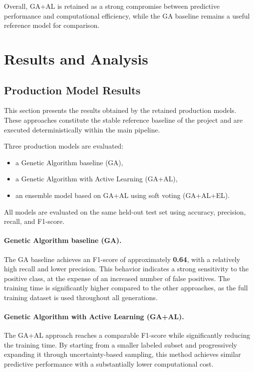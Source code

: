 \documentclass[12pt,a4paper]{article}
\begin{document}
\medskip

Overall, GA+AL is retained as a strong compromise between predictive performance and computational efficiency, while the GA baseline remains a useful reference model for comparison.

\section{Results and Analysis}

\subsection{Production Model Results}

This section presents the results obtained by the retained production models. These approaches constitute the stable reference baseline of the project and are executed deterministically within the main pipeline.

\medskip

Three production models are evaluated:
\begin{itemize}
    \item a Genetic Algorithm baseline (GA),
    \item a Genetic Algorithm with Active Learning (GA+AL),
    \item an ensemble model based on GA+AL using soft voting (GA+AL+EL).
\end{itemize}

All models are evaluated on the same held-out test set using accuracy, precision, recall, and F1-score.

\medskip

\paragraph{Genetic Algorithm baseline (GA).}
The GA baseline achieves an F1-score of approximately \textbf{0.64}, with a relatively high recall and lower precision. This behavior indicates a strong sensitivity to the positive class, at the expense of an increased number of false positives. The training time is significantly higher compared to the other approaches, as the full training dataset is used throughout all generations.

\medskip

\paragraph{Genetic Algorithm with Active Learning (GA+AL).}
The GA+AL approach reaches a comparable F1-score while significantly reducing the training time. By starting from a smaller labeled subset and progressively expanding it through uncertainty-based sampling, this method achieves similar predictive performance with a substantially lower computational cost.
\end{document}
